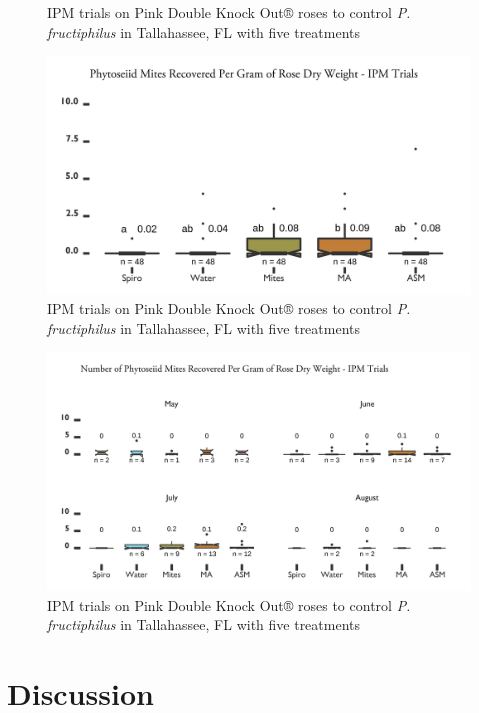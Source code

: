 \documentclass[12pt,final,CPage]{ufthesis}
\begin{document}
{\begin{figure}
{  }

  \caption{IPM trials on Pink Double Knock Out® roses to control \textit{P. fructiphilus} in Tallahassee, FL with five treatments}\label{fig:ipm-talla-tets-month}
  \end{figure}
  \begin{figure}

  {\centering \includegraphics[width=0.8\linewidth]{figure/rrv_ipm_graph_preds_talla} 

  }

  \caption{IPM trials on Pink Double Knock Out® roses to control \textit{P. fructiphilus} in Tallahassee, FL with five treatments}\label{fig:ipm-talla-preds}
  \end{figure}
  \begin{figure}

  {\centering \includegraphics[width=0.8\linewidth]{figure/rrv_ipm_graph_preds_talla_month} 

  }

  \caption{IPM trials on Pink Double Knock Out® roses to control \textit{P. fructiphilus} in Tallahassee, FL with five treatments}\label{fig:ipm-talla-preds-month}
  \end{figure}
  \hypertarget{dis-asm-ipm}{%
  \section{Discussion}\label{dis-asm-ipm}}

}
\end{document}
